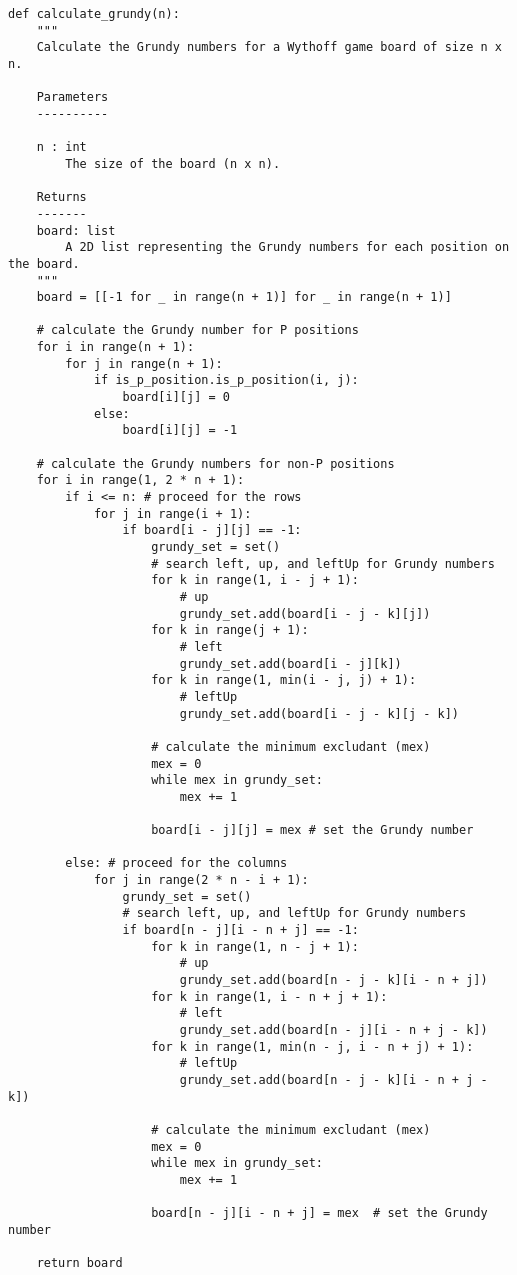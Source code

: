 \documentclass[uplatex,dvipdfmx,a4paper,10pt]{jsarticle}
\theoremstyle{definition}
\begin{document}
\begin{lstlisting}[caption={Wythoffニムのグランディ数を求めるプログラム}, label={code_wythoff}]
def calculate_grundy(n):
    """
    Calculate the Grundy numbers for a Wythoff game board of size n x n.
    
    Parameters
    ----------

    n : int
        The size of the board (n x n).

    Returns
    -------
    board: list
        A 2D list representing the Grundy numbers for each position on the board.
    """
    board = [[-1 for _ in range(n + 1)] for _ in range(n + 1)]

    # calculate the Grundy number for P positions
    for i in range(n + 1):
        for j in range(n + 1):
            if is_p_position.is_p_position(i, j):
                board[i][j] = 0
            else:
                board[i][j] = -1

    # calculate the Grundy numbers for non-P positions
    for i in range(1, 2 * n + 1):
        if i <= n: # proceed for the rows
            for j in range(i + 1):
                if board[i - j][j] == -1:
                    grundy_set = set()
                    # search left, up, and leftUp for Grundy numbers
                    for k in range(1, i - j + 1):
                        # up
                        grundy_set.add(board[i - j - k][j])
                    for k in range(j + 1):
                        # left
                        grundy_set.add(board[i - j][k])
                    for k in range(1, min(i - j, j) + 1):
                        # leftUp
                        grundy_set.add(board[i - j - k][j - k])

                    # calculate the minimum excludant (mex)
                    mex = 0
                    while mex in grundy_set:
                        mex += 1

                    board[i - j][j] = mex # set the Grundy number

        else: # proceed for the columns
            for j in range(2 * n - i + 1):
                grundy_set = set()
                # search left, up, and leftUp for Grundy numbers
                if board[n - j][i - n + j] == -1:
                    for k in range(1, n - j + 1):
                        # up
                        grundy_set.add(board[n - j - k][i - n + j])
                    for k in range(1, i - n + j + 1):
                        # left
                        grundy_set.add(board[n - j][i - n + j - k])
                    for k in range(1, min(n - j, i - n + j) + 1):
                        # leftUp
                        grundy_set.add(board[n - j - k][i - n + j - k])

                    # calculate the minimum excludant (mex)
                    mex = 0
                    while mex in grundy_set:
                        mex += 1

                    board[n - j][i - n + j] = mex  # set the Grundy number

    return board
\end{lstlisting}
\end{document}
